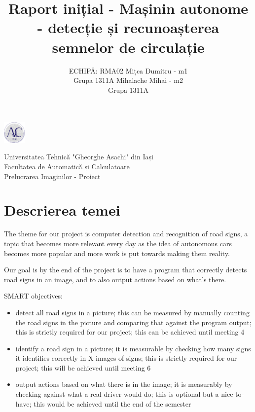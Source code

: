 \documentclass{article}
\title{Raport inițial - Mașinin autonome - detecție și recunoașterea semnelor de circulație}
\author{%
 ECHIPĂ: RMA02
 \AND
 Mițca Dumitru - m1 \\
 Grupa 1311A
 \AND
 Mihalache Mihai - m2 \\
 Grupa 1311A
}
\begin{document}
\noindent\begin{minipage}{0.1\textwidth}%
\includegraphics[width=1.1cm]{imagini/logo_AC.png}
\end{minipage}%
\hfill%
\begin{minipage}{1\textwidth}\raggedright
Universitatea Tehnică "Gheorghe Asachi" din Iași\\
Facultatea de Automatică și Calculatoare\\
Prelucrarea Imaginilor - Proiect
\end{minipage}

\maketitle

\section{Descrierea temei}


The theme for our project is computer detection and recognition of road signs, a topic that becomes
more relevant every day as the idea of autonomous cars becomes more popular and more work is put
towards making them reality.

Our goal is by the end of the project is to have a program that correctly detects road signs in an image,
and to also output actions based on what's there.

SMART objectives:
\begin{itemize}
  \item detect all road signs in a picture; this can be measured by manually counting the road signs in the picture
  and comparing that against the program output; this is strictly required for our project; this can be achieved until
  meeting 4
  \item identify a road sign in a picture; it is measurable by checking how many signs it identifies correctly in X
  images of signs; this is strictly required for our project; this will be achieved until meeting 6
  \item output actions based on what there is in the image; it is measurably by checking against what a real driver
  would do; this is optional but a nice-to-have; this would be achieved until the end of the semester
\end{itemize}
\end{document}
